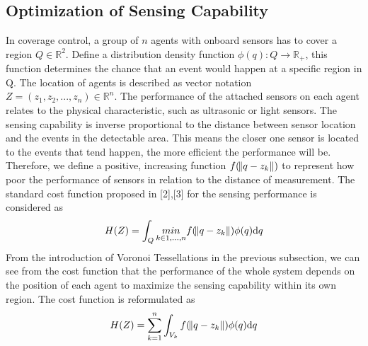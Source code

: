 \subsection{Optimization of Sensing Capability}
In coverage control, a group of ${n}$ agents with onboard sensors has to cover a region ${Q \in \mathbb{R}^2}$. Define a distribution density function ${\phi(q): Q \rightarrow \mathbb{R}_+}$, this function determines the chance that an event would happen at a specific region in Q. The location of agents is described as vector notation ${Z = (z_1, z_2, ..., z_n) \in \mathbb{R}^n}$. The performance of the attached sensors on each agent relates to the physical characteristic, such as ultrasonic or light sensors. The sensing capability is inverse proportional to the distance between sensor location and the events in the detectable area. This means the closer one sensor is located to the events that tend happen, the more efficient the performance will be. Therefore, we define a positive, increasing function ${f(\norm{q - z_k})}$ to represent how poor the performance of sensors in relation to the distance of measurement. The standard cost function proposed in [2],[3] for the sensing performance is considered as\\
\begin{equation}
H(Z) = \displaystyle \int_{Q} \underset{k \in {1,...,n}}{\normalfont{min}} f(\norm{q - {z_{k}}}) \phi(q) \mathrm{d}q \label{general_cost_function}
\end{equation}
From the introduction of Voronoi Tessellations in the previous subsection, we can see from the cost function that the performance of the whole system depends on the position of each agent to maximize the sensing capability within its own region. The cost function is reformulated as 
\begin{equation}
H(Z) = \displaystyle\sum_{k=1}^{n}  \int_{V_{k}}  f(\norm{q - {z_{k}}}) \phi(q) \mathrm{d}q \label{voronoi_cost_function}
\end{equation}

